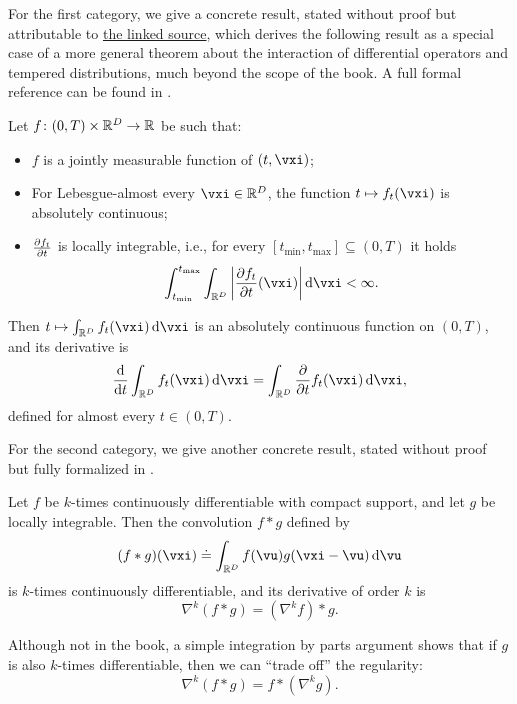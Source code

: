 \documentclass[../../book-main.tex]{subfiles}
\begin{document}
For the first category, we give a concrete result, stated without proof but attributable to \href{https://planetmath.org/differentiationundertheintegralsign}{the linked source}, which derives the following result as a special case of a more general theorem about the interaction of differential operators and tempered distributions, much beyond the scope of the book. A full formal reference can be found in \cite{jones1982theory}.
\begin{proposition}\label{prop:dutis}
    Let \(f \colon (0, T) \times \mathbb{R}^{D} \to \mathbb{R}\) be such that:
    \begin{itemize}
        \item \(f\) is a jointly measurable function of \((t, \vxi)\);
        \item For Lebesgue-almost every \(\vxi \in \R^{D}\), the function \(t \mapsto f_{t}(\vxi)\) is absolutely continuous;
        \item \(\pdv{f_{t}}{t}\) is locally integrable, i.e., for every \([t_{\min}, t_{\max}] \subseteq (0, T)\) it holds 
        \begin{equation}
            \int_{t_{\min}}^{t_{\max}}\int_{\R^{D}}\abs*{\pdv{f_{t}}{t}(\vxi)}\odif{\vxi} < \infty.
        \end{equation}
    \end{itemize}
    Then \(t \mapsto \int_{\R^{D}}f_{t}(\vxi)\odif{\vxi}\) is an absolutely continuous function on \((0, T)\), and its derivative is 
    \begin{equation}
        \odv*{\int_{\R^{D}}f_{t}(\vxi)\odif{\vxi}}{t} = \int_{\R^{D}}\pdv*{f_{t}}{t}(\vxi)\odif{\vxi},
    \end{equation}
    defined for almost every \(t \in (0, T)\).
\end{proposition}

For the second category, we give another concrete result, stated without proof but fully formalized in \cite{brezis2011functional}.
\begin{proposition}\label{prop:diff_convolution}
    Let \(f\) be \(k\)-times continuously differentiable with compact support, and let \(g\) be locally integrable. Then the convolution \(f * g\) defined by
    \begin{equation}
        (f * g)(\vxi) \doteq \int_{\R^{D}}f(\vu)g(\vxi - \vu)\odif{\vu}
    \end{equation}
    is \(k\)-times continuously differentiable, and its derivative of order \(k\) is 
    \begin{equation}
        \nabla^{k}(f * g) =(\nabla^{k}f) * g. 
    \end{equation}
\end{proposition}
Although not in the book, a simple integration by parts argument shows that if \(g\) is also \(k\)-times differentiable, then we can ``trade off'' the regularity:
\begin{equation}
    \nabla^{k}(f * g) = f * (\nabla^{k} g).
\end{equation}
\end{document}
